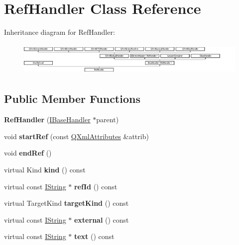 \hypertarget{class_ref_handler}{}\section{Ref\+Handler Class Reference}
\label{class_ref_handler}
Inheritance diagram for Ref\+Handler\+:\begin{figure}[H]
\begin{center}
\leavevmode
\includegraphics[height=1.632653cm]{class_ref_handler}
\end{center}
\end{figure}
\subsection*{Public Member Functions}
\begin{DoxyCompactItemize}
\item 
\mbox{\label{class_ref_handler_a4a9d65a9d665df590840700367e1bde2}} 
{\bfseries Ref\+Handler} (\mbox{\hyperlink{class_i_base_handler}{I\+Base\+Handler}} $\ast$parent)
\item 
\mbox{\label{class_ref_handler_ad83fb3f95a07655c936ec9af140609cf}} 
void {\bfseries start\+Ref} (const \mbox{\hyperlink{class_q_xml_attributes}{Q\+Xml\+Attributes}} \&attrib)
\item 
\mbox{\label{class_ref_handler_a8d591bcf141b0bcba9f63e70beb75f4a}} 
void {\bfseries end\+Ref} ()
\item 
\mbox{\label{class_ref_handler_a1b591d97a9c7e59e56e235e0e6467454}} 
virtual Kind {\bfseries kind} () const
\item 
\mbox{\label{class_ref_handler_a74ef4e5b4f845b13ef7446277499f15f}} 
virtual const \mbox{\hyperlink{class_i_string}{I\+String}} $\ast$ {\bfseries ref\+Id} () const
\item 
\mbox{\label{class_ref_handler_a462d253170350c332701228d23762c8f}} 
virtual Target\+Kind {\bfseries target\+Kind} () const
\item 
\mbox{\label{class_ref_handler_a1c40478ef79636e9e3d8ce1f2c6e201e}} 
virtual const \mbox{\hyperlink{class_i_string}{I\+String}} $\ast$ {\bfseries external} () const
\item 
\mbox{\label{class_ref_handler_ae79d114d6a815c07b0e2d5fc93aac52b}} 
virtual const \mbox{\hyperlink{class_i_string}{I\+String}} $\ast$ {\bfseries text} () const
\end{DoxyCompactItemize}
